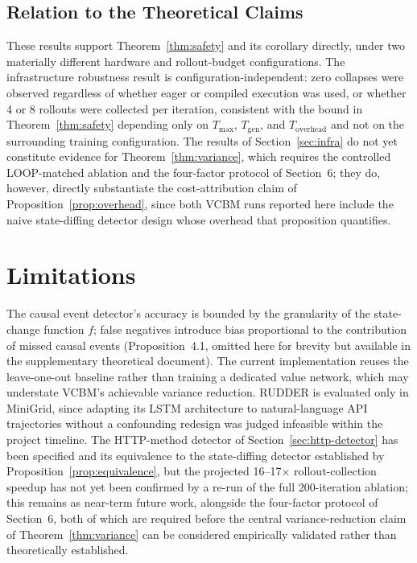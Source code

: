 \documentclass[11pt]{article}
\begin{document}
\subsection{Relation to the Theoretical Claims}

These results support Theorem~\ref{thm:safety} and its corollary directly,
under two materially different hardware and rollout-budget configurations.
The infrastructure robustness result is configuration-independent: zero
collapses were observed regardless of whether eager or compiled execution was
used, or whether 4 or 8 rollouts were collected per iteration, consistent with
the bound in Theorem~\ref{thm:safety} depending only on $T_{\max}$,
$T_{\mathrm{gen}}$, and $T_{\mathrm{overhead}}$ and not on the surrounding
training configuration. The results of Section~\ref{sec:infra} do not yet
constitute evidence for Theorem~\ref{thm:variance}, which requires the
controlled LOOP-matched ablation and the four-factor protocol of Section~6;
they do, however, directly substantiate the cost-attribution claim of
Proposition~\ref{prop:overhead}, since both VCBM runs reported here include
the naive state-diffing detector design whose overhead that proposition
quantifies.

\section{Limitations}

The causal event detector's accuracy is bounded by the granularity of the
state-change function $f$; false negatives introduce bias proportional to the
contribution of missed causal events (Proposition~4.1, omitted here for
brevity but available in the supplementary theoretical document). The current
implementation reuses the leave-one-out baseline rather than training a
dedicated value network, which may understate VCBM's achievable variance
reduction. RUDDER is evaluated only in MiniGrid, since adapting its LSTM
architecture to natural-language API trajectories without a confounding
redesign was judged infeasible within the project timeline. The HTTP-method
detector of Section~\ref{sec:http-detector} has been specified and its
equivalence to the state-diffing detector established by
Proposition~\ref{prop:equivalence}, but the projected 16--17$\times$
rollout-collection speedup has not yet been confirmed by a re-run of the full
200-iteration ablation; this remains as near-term future work, alongside the
four-factor protocol of Section~6, both of which are required before the
central variance-reduction claim of Theorem~\ref{thm:variance} can be
considered empirically validated rather than theoretically established.
\end{document}
